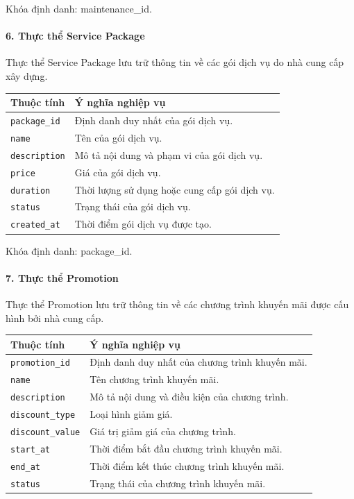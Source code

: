 Khóa định danh: maintenance\_id.

\paragraph{6. Thực thể Service Package}\mbox{}\par

Thực thể Service Package lưu trữ thông tin về các gói dịch vụ do nhà cung cấp xây dựng.

\begin{center}
\scriptsize
\begin{tabular}{p{.25\linewidth} p{.65\linewidth}}
\toprule
Thuộc tính & Ý nghĩa nghiệp vụ \\
\midrule
\texttt{package\_id} & Định danh duy nhất của gói dịch vụ. \\
\texttt{name} & Tên của gói dịch vụ. \\
\texttt{description} & Mô tả nội dung và phạm vi của gói dịch vụ. \\
\texttt{price} & Giá của gói dịch vụ. \\
\texttt{duration} & Thời lượng sử dụng hoặc cung cấp gói dịch vụ. \\
\texttt{status} & Trạng thái của gói dịch vụ. \\
\texttt{created\_at} & Thời điểm gói dịch vụ được tạo. \\
\bottomrule
\end{tabular}
\end{center}

Khóa định danh: package\_id.

\paragraph{7. Thực thể Promotion}\mbox{}\par

Thực thể Promotion lưu trữ thông tin về các chương trình khuyến mãi được cấu hình bởi nhà cung cấp.

\begin{center}
\scriptsize
\begin{tabular}{p{.25\linewidth} p{.65\linewidth}}
\toprule
Thuộc tính & Ý nghĩa nghiệp vụ \\
\midrule
\texttt{promotion\_id} & Định danh duy nhất của chương trình khuyến mãi. \\
\texttt{name} & Tên chương trình khuyến mãi. \\
\texttt{description} & Mô tả nội dung và điều kiện của chương trình. \\
\texttt{discount\_type} & Loại hình giảm giá. \\
\texttt{discount\_value} & Giá trị giảm giá của chương trình. \\
\texttt{start\_at} & Thời điểm bắt đầu chương trình khuyến mãi. \\
\texttt{end\_at} & Thời điểm kết thúc chương trình khuyến mãi. \\
\texttt{status} & Trạng thái của chương trình khuyến mãi. \\
\bottomrule
\end{tabular}
\end{center}

